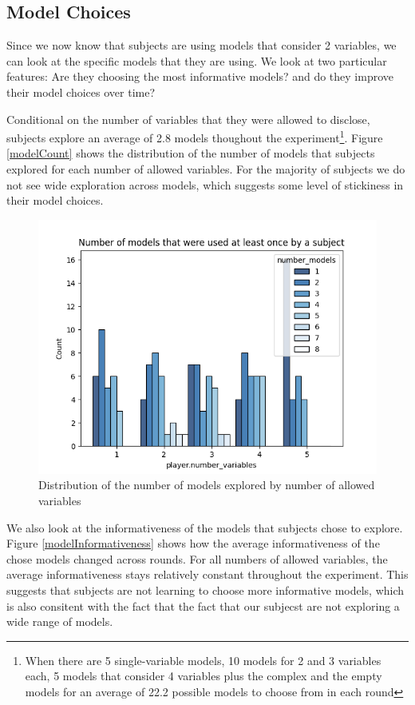 \documentclass[
  12pt,
]{article}
\begin{document}
\hypertarget{model-choices}{%
\subsection{Model Choices}\label{model-choices}}

Since we now know that subjects are using models that consider 2
variables, we can look at the specific models that they are using. We
look at two particular features: Are they choosing the most informative
models? and do they improve their model choices over time?

Conditional on the number of variables that they were allowed to
disclose, subjects explore an average of 2.8 models thoughout the
experiment\footnote{When there are 5 single-variable models, 10 models 
for 2 and 3 variables each, 5 models that consider 4 variables plus the complex and the empty models for an average of 22.2 
possible models to choose from in each round}. Figure \ref{modelCount}
shows the distribution of the number of models that subjects explored
for each number of allowed variables. For the majority of subjects we do
not see wide exploration across models, which suggests some level of
stickiness in their model choices.

\begin{figure}

{\centering \includegraphics[width=0.65\linewidth]{../computed_objects/figures/model_count} 

}

\caption{\label{modelCount} Distribution of the number of models explored by number of allowed variables}\label{fig:modelCount}
\end{figure}

We also look at the informativeness of the models that subjects chose to
explore. Figure \ref{modelInformativeness} shows how the average
informativeness of the chose models changed across rounds. For all
numbers of allowed variables, the average informativeness stays
relatively constant throughout the experiment. This suggests that
subjects are not learning to choose more informative models, which is
also consitent with the fact that the fact that our subjecst are not
exploring a wide range of models.
\end{document}
